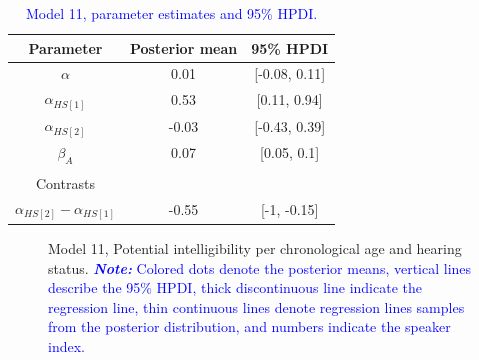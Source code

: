 \documentclass[
  authoryear,
  preprint,
  1p]{elsarticle}
\begin{document}
\begin{longtable}[]{@{}ccc@{}}

\caption{\label{tbl-parameter-model11}\textcolor{blue}{Model 11, parameter estimates and
95\% HPDI.}}

\tabularnewline

\toprule\noalign{}
Parameter & Posterior mean & 95\% HPDI \\
\midrule\noalign{}
\endhead
\bottomrule\noalign{}
\endlastfoot
\(\alpha\) & 0.01 & {[}-0.08, 0.11{]} \\
\(\alpha_{HS[1]}\) & 0.53 & {[}0.11, 0.94{]} \\
\(\alpha_{HS[2]}\) & -0.03 & {[}-0.43, 0.39{]} \\
\(\beta_{A}\) & 0.07 & {[}0.05, 0.1{]} \\
& & \\
Contrasts & & \\
\(\alpha_{HS[2]} - \alpha_{HS[1]}\) & -0.55 & {[}-1, -0.15{]} \\

\end{longtable}

\label{cell-fig-rq3-intelligibility-model11}
\begin{figure}[H]


\caption{\label{fig-rq3-intelligibility-model11}Model 11, Potential
intelligibility per chronological age and hearing status.
\textcolor{blue}{\textbf{\emph{Note:}} Colored dots denote the posterior means, vertical
lines describe the 95\% HPDI, thick discontinuous line indicate the
regression line, thin continuous lines denote regression lines samples
from the posterior distribution, and numbers indicate the speaker
index.}}

\end{figure}%
\end{document}
